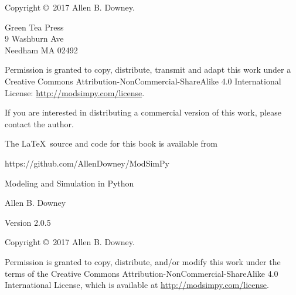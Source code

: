 \documentclass[12pt]{book}
\newcommand{\thetitle}{Modeling and Simulation in Python}
\newcommand{\theauthors}{Allen B. Downey}
\newcommand{\theversion}{2.0.5}
\theoremstyle{exercise}
\begin{document}
\begin{latexonly}
\begin{flushright}
\vfill

\end{flushright}



\pagebreak
\thispagestyle{empty}

Copyright \copyright ~2017 \theauthors.



\vspace{0.2in}

\begin{flushleft}
Green Tea Press       \\
9 Washburn Ave \\
Needham MA 02492
\end{flushleft}

Permission is granted to copy, distribute, transmit and adapt this work under a Creative Commons Attribution-NonCommercial-ShareAlike 4.0 International License: \url{http://modsimpy.com/license}.

If you are interested in distributing a commercial version of this
work, please contact the author.

The \LaTeX\ source and code for this book is available from

\begin{code}
https://github.com/AllenDowney/ModSimPy
\end{code}


\cleardoublepage
\setcounter{tocdepth}{1}
\tableofcontents

\end{latexonly}



\begin{htmlonly}

\vspace{1em}

{\Large \thetitle}

{\large \theauthors}

Version \theversion

\vspace{1em}

Copyright \copyright ~2017 \theauthors.

Permission is granted to copy, distribute, and/or modify this work
under the terms of the Creative Commons
Attribution-NonCommercial-ShareAlike 4.0 International License, which is
available at \url{http://modsimpy.com/license}.

\vspace{1em}

\setcounter{chapter}{-1}

\end{htmlonly}
\end{document}
